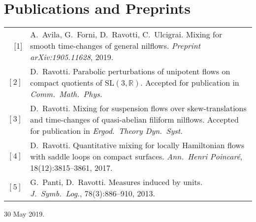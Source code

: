 \documentclass[a4paper,10pt]{article}
\begin{document}

\section{Publications and Preprints}
\begin{tabularx}{\linewidth}{r X}
[1] & A.~Avila, G.~Forni, D.~Ravotti, C.~Ulcigrai. Mixing for smooth time-changes of general nilflows. \emph{Preprint arXiv:1905.11628}, 2019.\\
%
$[2]$ & D.~Ravotti. Parabolic perturbations of unipotent flows on compact quotients of SL$(3, \mathbb{R})$. 
Accepted for publication in \emph{Comm.~Math.~Phys.} \\
%
$[3]$ & D.~Ravotti. Mixing for suspension flows over skew-translations and time-changes of quasi-abelian filiform nilflows. Accepted for publication in \emph{Ergod.~Theory Dyn.~Syst.}\\
%
$[4]$ & D.~Ravotti. Quantitative mixing for locally Hamiltonian flows with saddle loops on compact surfaces. \emph{Ann.~Henri Poincaré}, 18(12):3815--3861, 2017.\\
%
$[5]$ & G.~Panti, D.~Ravotti. Measures induced by units. \emph{J.~Symb.~Log.}, 78(3):886--910, 2013.\\
\end{tabularx}

\vspace{20pt}

30 May 2019.
\end{document}
